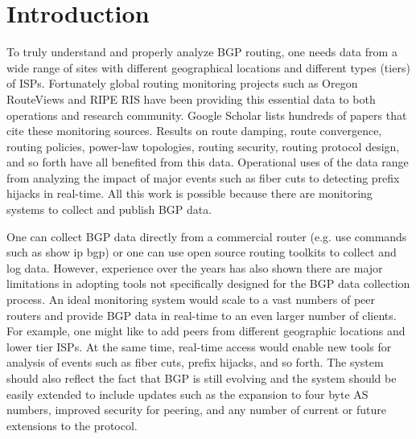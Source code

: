 \section{Introduction}
\label{sec:intro}


To truly understand and properly analyze BGP routing, one needs data from a wide range of sites with different geographical locations and different types (tiers) of ISPs.  Fortunately global routing monitoring projects such as Oregon RouteViews\cite{routeviews} and RIPE RIS\cite{riperis} have been providing this essential data to both operations and research community.    Google Scholar lists hundreds of papers that cite these monitoring sources.   Results on route damping, route convergence, routing policies, power-law topologies, routing security, routing protocol design, and so forth have all benefited from this data.  Operational uses of the data range from analyzing the impact of major events such as fiber cuts to detecting prefix hijacks in real-time.      All this work is possible because there are monitoring systems to collect and publish BGP data.

One can collect BGP data directly from a commercial router (e.g. use commands such as show ip bgp) or one can use open source routing toolkits to collect and log data.    However, experience over the years has also shown there are major limitations in adopting tools not specifically designed for the BGP data collection process.   An ideal monitoring system would scale to a vast numbers of peer routers and provide BGP data in real-time to an even larger number of clients.   For example,  one might like to add peers from different geographic locations and lower tier ISPs.    At the same time,  real-time access would enable new tools for analysis of events such as fiber cuts, prefix hijacks, and so forth.     The system should also reflect the fact that BGP is still evolving and the system should be easily extended to include updates such as the expansion to four byte AS numbers, improved security for peering, and any number of current or future extensions to the protocol.

